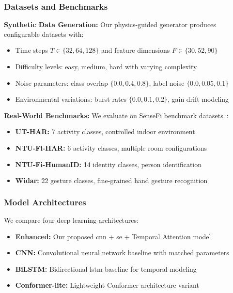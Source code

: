 \documentclass[journal]{IEEEtran}
\begin{document}
\subsubsection{Datasets and Benchmarks}

\textbf{Synthetic Data Generation:} Our physics-guided generator produces configurable datasets with:
\begin{itemize}
\item Time steps $T \in \{32, 64, 128\}$ and feature dimensions $F \in \{30, 52, 90\}$
\item Difficulty levels: easy, medium, hard with varying complexity
\item Noise parameters: class overlap $\{0.0, 0.4, 0.8\}$, label noise $\{0.0, 0.05, 0.1\}$
\item Environmental variations: burst rates $\{0.0, 0.1, 0.2\}$, gain drift modeling
\end{itemize}

\textbf{Real-World Benchmarks:} We evaluate on SenseFi benchmark datasets~\cite{yang2023sensefi}:
\begin{itemize}
\item \textbf{UT-HAR:} 7 activity classes, controlled indoor environment
\item \textbf{NTU-Fi-HAR:} 6 activity classes, multiple room configurations
\item \textbf{NTU-Fi-HumanID:} 14 identity classes, person identification
\item \textbf{Widar:} 22 gesture classes, fine-grained hand gesture recognition
\end{itemize}

\subsubsection{Model Architectures}

We compare four deep learning architectures:
\begin{itemize}
\item \textbf{Enhanced:} Our proposed \gls{cnn} + \gls{se} + Temporal Attention model
\item \textbf{CNN:} Convolutional neural network baseline with matched parameters
\item \textbf{BiLSTM:} Bidirectional \gls{lstm} baseline for temporal modeling
\item \textbf{Conformer-lite:} Lightweight Conformer architecture variant
\end{itemize}
\end{document}
